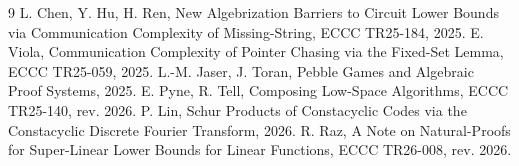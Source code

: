\documentclass[11pt]{article}
\begin{document}
\begin{thebibliography}{9}
 L. Chen, Y. Hu, H. Ren, New Algebrization Barriers to Circuit Lower Bounds via Communication Complexity of Missing-String, ECCC TR25-184, 2025.
 E. Viola, Communication Complexity of Pointer Chasing via the Fixed-Set Lemma, ECCC TR25-059, 2025.
 L.-M. Jaser, J. Toran, Pebble Games and Algebraic Proof Systems, 2025.
 E. Pyne, R. Tell, Composing Low-Space Algorithms, ECCC TR25-140, rev. 2026.
 P. Lin, Schur Products of Constacyclic Codes via the Constacyclic Discrete Fourier Transform, 2026.
 R. Raz, A Note on Natural-Proofs for Super-Linear Lower Bounds for Linear Functions, ECCC TR26-008, rev. 2026.
\end{thebibliography}
\end{document}
